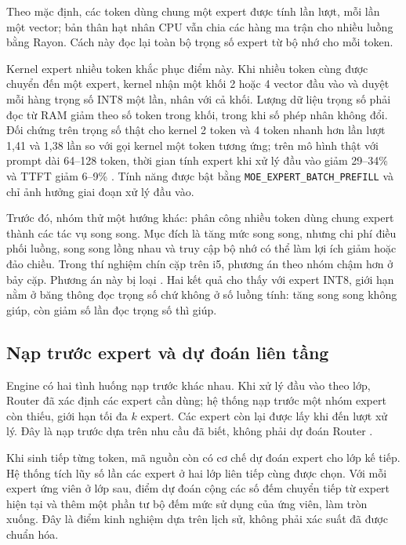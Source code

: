 Theo mặc định, các token dùng chung một expert được tính lần lượt, mỗi lần một vector; bản thân hạt nhân CPU vẫn chia các hàng ma trận cho nhiều luồng bằng Rayon. Cách này đọc lại toàn bộ trọng số expert từ bộ nhớ cho mỗi token.

Kernel expert nhiều token khắc phục điểm này. Khi nhiều token cùng được chuyển đến một expert, kernel nhận một khối 2 hoặc 4 vector đầu vào và duyệt mỗi hàng trọng số INT8 một lần, nhân với cả khối. Lượng dữ liệu trọng số phải đọc từ RAM giảm theo số token trong khối, trong khi số phép nhân không đổi. Đối chứng trên trọng số thật cho kernel 2 token và 4 token nhanh hơn lần lượt 1,41 và 1,38 lần so với gọi kernel một token tương ứng; trên mô hình thật với prompt dài 64--128 token, thời gian tính expert khi xử lý đầu vào giảm 29--34\% và TTFT giảm 6--9\% \cite{exp_expert_batch}. Tính năng được bật bằng \texttt{MOE\_EXPERT\_BATCH\_PREFILL} và chỉ ảnh hưởng giai đoạn xử lý đầu vào.

Trước đó, nhóm thử một hướng khác: phân công nhiều token dùng chung expert thành các tác vụ song song. Mục đích là tăng mức song song, nhưng chi phí điều phối luồng, song song lồng nhau và truy cập bộ nhớ có thể làm lợi ích giảm hoặc đảo chiều. Trong thí nghiệm chín cặp trên i5, phương án theo nhóm chậm hơn ở bảy cặp. Phương án này bị loại \cite{exp_prefill_i5}. Hai kết quả cho thấy với expert INT8, giới hạn nằm ở băng thông đọc trọng số chứ không ở số luồng tính: tăng song song không giúp, còn giảm số lần đọc trọng số thì giúp.

\subsection{Nạp trước expert và dự đoán liên tầng}

Engine có hai tình huống nạp trước khác nhau. Khi xử lý đầu vào theo lớp, Router đã xác định các expert cần dùng; hệ thống nạp trước một nhóm expert còn thiếu, giới hạn tối đa $k$ expert. Các expert còn lại được lấy khi đến lượt xử lý. Đây là nạp trước dựa trên nhu cầu đã biết, không phải dự đoán Router \cite{moe_tierengine_arch}.

Khi sinh tiếp từng token, mã nguồn còn có cơ chế dự đoán expert cho lớp kế tiếp. Hệ thống tích lũy số lần các expert ở hai lớp liên tiếp cùng được chọn. Với mỗi expert ứng viên ở lớp sau, điểm dự đoán cộng các số đếm chuyển tiếp từ expert hiện tại và thêm một phần tư bộ đếm mức sử dụng của ứng viên, làm tròn xuống. Đây là điểm kinh nghiệm dựa trên lịch sử, không phải xác suất đã được chuẩn hóa.

